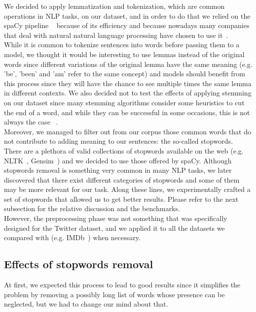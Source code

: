 We decided to apply lemmatization and tokenization, which are common operations in NLP tasks, on our dataset, and in order to do that we relied on the spaCy pipeline ~\cite{startups:spaCy} because of its efficiency and because nowadays many companies that deal with natural natural language processing have chosen to use it~\cite{data:companies_using_spacy}.\\

While it is common to tokenize sentences into words before passing them to a model, we thought it would be interesting to use lemmas instead of the original words since different variations of the original lemma have the same meaning (e.g. 'be', 'been' and 'am' refer to the same concept) and models should benefit from this process since they will have the chance to see multiple times the same lemma in different contexts. We also decided not to test the effects of applying stemming on our dataset since many stemming algorithms consider some heuristics to cut the end of a word, and while they can be successful in some occasions, this is not always the case ~\cite{data:standfordNLP}.\\

Moreover, we managed to filter out from our corpus those common words that do not contribute to adding meaning to our sentences: the so-called stopwords. There are a plethora of valid collections of stopwords available on the web (e.g. NLTK~\cite{startups:nltk}, Gensim~\cite{startups:gensim}) and we decided to use those offered by spaCy. Although stopwords removal is something very common in many NLP tasks, we later discovered that there exist different categories of stopwords and some of them may be more relevant for our task.
Along these lines, we experimentally crafted a set of stopwords that allowed us to get better results. Please refer to the next subsection for the relative discussion and the benchmarks.\\

However, the preprocessing phase was not something that was specifically designed for the Twitter dataset, and we applied it to all the datasets we compared with (e.g. IMDb~\cite{data:imdb}) when necessary.

\subsection*{Effects of stopwords removal}

At first, we expected this process to lead to good results since it simplifies the problem by removing a possibly long list of words whose presence can be neglected, but we had to change our mind about that.\\


